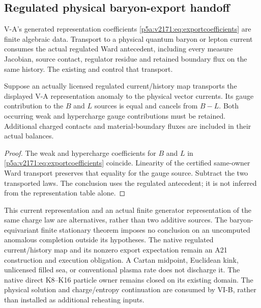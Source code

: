 \documentclass[12pt,a4paper]{article}
\begin{document}
\subsection{Regulated physical baryon-export handoff}
\label{p12:v2171:sec:baryonexporthandoff}
V-A's generated representation coefficients
\eqref{p5a:v2171:eq:exportcoefficients} are finite algebraic data. Transport to a
physical quantum baryon or lepton current consumes the actual regulated
Ward antecedent, including every measure Jacobian, source contact, regulator
residue and retained boundary flux on the same history. The existing
 and
 control that transport.
\begin{proposition}
\label{p12:v2171:prop:baryonexport}
Suppose an actually licensed regulated current/history map transports the
displayed V-A representation anomaly to the physical vector currents.
Its gauge contribution to the $B$ and $L$ sources is equal and cancels
from $B-L$. Both occurring weak and hypercharge gauge contributions must
be retained. Additional charged contacts and material-boundary fluxes are
included in their actual balances.
\end{proposition}
\begin{proof}
The weak and hypercharge coefficients for $B$ and $L$ in
\eqref{p5a:v2171:eq:exportcoefficients} coincide. Linearity of the certified
same-owner Ward transport preserves that equality for the gauge source.
Subtract the two transported laws. The conclusion uses the regulated
antecedent; it is not inferred from the representation table alone.
\end{proof}
This current representation and an actual finite generator representation
of the same charge law are alternatives, rather than two additive sources.
The baryon-equivariant finite stationary theorem imposes no conclusion on
an uncomputed anomalous completion outside its hypotheses.
The native regulated current/history map and its nonzero export expectation
remain an A21 construction and execution obligation. A Cartan midpoint,
Euclidean kink, unlicensed filled sea, or conventional plasma rate does not
discharge it. The native direct K8--K16 particle owner remains closed on its
existing domain. The physical solution and charge/entropy continuation are
consumed by VI-B, rather than installed as additional reheating inputs.

\end{document}

